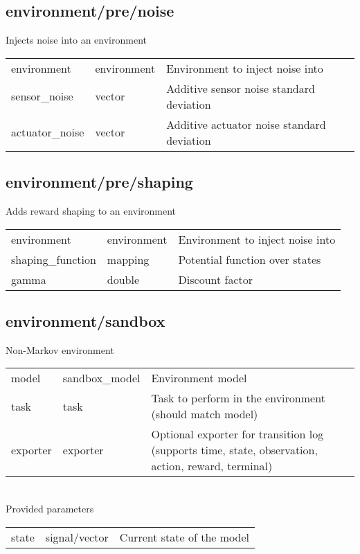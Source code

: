 \subsection{environment/pre/noise}
\noindent Injects noise into an environment\\

\noindent\begin{tabular}{@{}lll@{}}
environment&environment&Environment to inject noise into\\
sensor\_noise&vector&Additive sensor noise standard deviation\\
actuator\_noise&vector&Additive actuator noise standard deviation\\
\end{tabular}
\subsection{environment/pre/shaping}
\noindent Adds reward shaping to an environment\\

\noindent\begin{tabular}{@{}lll@{}}
environment&environment&Environment to inject noise into\\
shaping\_function&mapping&Potential function over states\\
gamma&double&Discount factor\\
\end{tabular}
\subsection{environment/sandbox}
\noindent Non-Markov environment\\

\noindent\begin{tabular}{@{}lll@{}}
model&sandbox\_model&Environment model\\
task&task&Task to perform in the environment (should match model)\\
exporter&exporter&Optional exporter for transition log (supports time, state, observation, action, reward, terminal)\\
\end{tabular}
\\

\noindent Provided parameters\\

\noindent\begin{tabular}{@{}lll@{}}
state&signal/vector&Current state of the model\\
\end{tabular}
